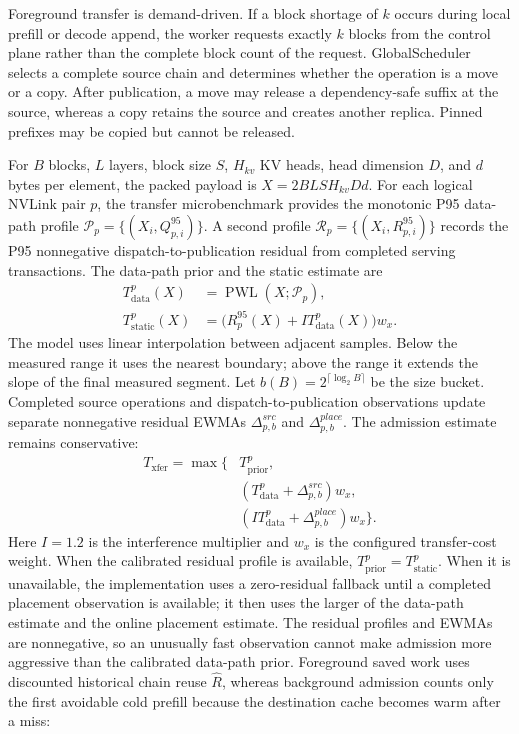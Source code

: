 \documentclass{article}
\begin{document}
Foreground transfer is demand-driven. If a block shortage of $k$ occurs during local prefill or decode append, the worker requests exactly $k$ blocks from the control plane rather than the complete block count of the request. GlobalScheduler selects a complete source chain and determines whether the operation is a move or a copy. After publication, a move may release a dependency-safe suffix at the source, whereas a copy retains the source and creates another replica. Pinned prefixes may be copied but cannot be released.

For $B$ blocks, $L$ layers, block size $S$, $H_{kv}$ KV heads, head dimension $D$, and $d$ bytes per element, the packed payload is $X=2BLSH_{kv}Dd$. For each logical NVLink pair $p$, the transfer microbenchmark provides the monotonic P95 data-path profile $\mathcal{P}_p=\{(X_i,Q^{95}_{p,i})\}$. A second profile $\mathcal{R}_p=\{(X_i,R^{95}_{p,i})\}$ records the P95 nonnegative dispatch-to-publication residual from completed serving transactions. The data-path prior and the static estimate are
\begin{align}
 T_{\mathrm{data}}^{p}(X) &= \operatorname{PWL}(X;\mathcal{P}_p), \\
 T_{\mathrm{static}}^{p}(X) &= \bigl(R^{95}_{p}(X)+I T_{\mathrm{data}}^{p}(X)\bigr)w_x.
\end{align}
The model uses linear interpolation between adjacent samples. Below the measured range it uses the nearest boundary; above the range it extends the slope of the final measured segment. Let $b(B)=2^{\lceil\log_2 B\rceil}$ be the size bucket. Completed source operations and dispatch-to-publication observations update separate nonnegative residual EWMAs $\Delta^{src}_{p,b}$ and $\Delta^{place}_{p,b}$. The admission estimate remains conservative:
\begin{equation}
\begin{aligned}
 T_{\mathrm{xfer}}=\max\bigl\{&
 T_{\mathrm{prior}}^{p},\\
 &(T_{\mathrm{data}}^{p}+\Delta^{src}_{p,b})w_x,\\
 &(I T_{\mathrm{data}}^{p}+\Delta^{place}_{p,b})w_x
 \bigr\}.
\end{aligned}
\end{equation}
Here $I=1.2$ is the interference multiplier and $w_x$ is the configured transfer-cost weight. When the calibrated residual profile is available, $T_{\mathrm{prior}}^{p}=T_{\mathrm{static}}^{p}$. When it is unavailable, the implementation uses a zero-residual fallback until a completed placement observation is available; it then uses the larger of the data-path estimate and the online placement estimate. The residual profiles and EWMAs are nonnegative, so an unusually fast observation cannot make admission more aggressive than the calibrated data-path prior. Foreground saved work uses discounted historical chain reuse $\widehat{R}$, whereas background admission counts only the first avoidable cold prefill because the destination cache becomes warm after a miss:
\end{document}
